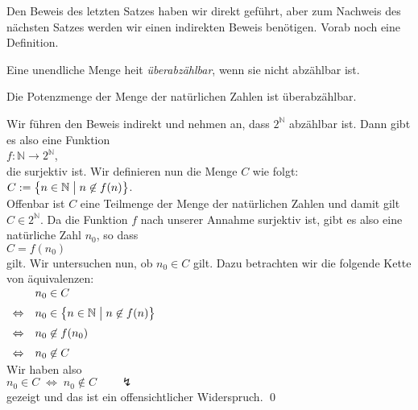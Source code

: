 Den Beweis des letzten Satzes haben wir direkt gef\"{u}hrt, aber zum Nachweis des n\"{a}chsten Satzes werden wir
einen indirekten Beweis ben\"{o}tigen.  Vorab noch eine Definition.

\begin{Definition} \lb
Eine unendliche Menge hei\3t \emph{\"{u}berabz\"{a}hlbar}, wenn sie nicht abz\"{a}hlbar ist.
\end{Definition}

\begin{Satz}
  Die Potenzmenge der Menge der nat\"{u}rlichen Zahlen ist \"{u}berabz\"{a}hlbar.
\end{Satz}

\proof
Wir f\"{u}hren den Beweis indirekt und nehmen an, dass $2^{\mathbb{N}}$ abz\"{a}hlbar ist.  Dann gibt es also
eine Funktion
\\[0.2cm]
\hspace*{1.3cm}
$f: \mathbb{N} \rightarrow 2^{\mathbb{N}}$,
\\[0.2cm]
die surjektiv ist.  Wir definieren nun die Menge $C$ wie folgt:
\\[0.2cm]
\hspace*{1.3cm}
$C := \bigl\{ n \in \mathbb{N} \bigm| n \not\in f(n) \bigr\}$.
\\[0.2cm]
Offenbar ist $C$ eine Teilmenge der Menge der nat\"{u}rlichen Zahlen und damit gilt $C \in 2^{\mathbb{N}}$.
Da die Funktion $f$ nach unserer Annahme surjektiv ist, gibt es also eine nat\"{u}rliche Zahl $n_0$, so
dass 
\\[0.2cm]
\hspace*{1.3cm}
$C = f(n_0)$
\\[0.2cm]
gilt.  Wir untersuchen nun, ob $n_0 \in C$ gilt.  Dazu betrachten wir die folgende Kette von
\"{a}quivalenzen: 
\\[-0.2cm]
\hspace*{1.3cm}
$
\begin{array}[t]{cl}
                & n_0 \in C                                                      \\[0.2cm]
\Leftrightarrow & n_0 \in \bigl\{ n \in \mathbb{N} \bigm| n \not\in f(n) \bigr\} \\[0.2cm]
\Leftrightarrow & n_0 \not\in f(n_0)                                             \\[0.2cm]
\Leftrightarrow & n_0 \not\in C                                               
\end{array}
$
\\[0.2cm]
Wir haben also
\\[0.2cm]
\hspace*{1.3cm}
$n_0 \in C \;\Leftrightarrow\; n_0 \not\in C \qquad \lightning$
\\[0.2cm]
gezeigt und das ist ein offensichtlicher Widerspruch. \qed

